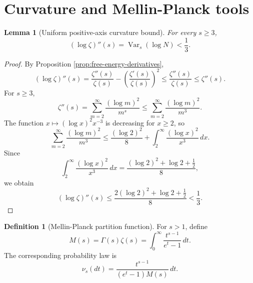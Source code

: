 \documentclass[11pt]{article}
\numberwithin{equation}{section}
\newtheorem{lemma}[theorem]{Lemma}
\theoremstyle{definition}
\newtheorem{definition}[theorem]{Definition}
\theoremstyle{remark}
\DeclareMathOperator{\Var}{Var}
\newcommand{\1}{\mathbf 1}
\begin{document}
\section{Curvature and Mellin-Planck tools}

\begin{lemma}[Uniform positive-axis curvature bound]
\label{lem:uniform-positive-axis-curvature}
For every \(s\ge3\),
\begin{equation}
\label{eq:uniform-curvature-bound}
(\log\zeta)''(s)=\Var_s(\log N)<\frac13.
\end{equation}
\end{lemma}

\begin{proof}
By Proposition \ref{prop:free-energy-derivatives},
\begin{equation}
\label{eq:curvature-first-bound}
(\log\zeta)''(s)
=\frac{\zeta''(s)}{\zeta(s)}
-\left(\frac{\zeta'(s)}{\zeta(s)}\right)^2
\le \frac{\zeta''(s)}{\zeta(s)}
\le \zeta''(s).
\end{equation}
For \(s\ge3\),
\begin{equation}
\label{eq:zeta-second-derivative-bound}
\zeta''(s)=\sum_{m=2}^{\infty}\frac{(\log m)^2}{m^s}
\le\sum_{m=2}^{\infty}\frac{(\log m)^2}{m^3}.
\end{equation}
The function \(x\mapsto(\log x)^2x^{-3}\) is decreasing for \(x\ge2\), so
\begin{equation}
\label{eq:curvature-integral-comparison}
\sum_{m=2}^{\infty}\frac{(\log m)^2}{m^3}
\le
\frac{(\log2)^2}{8}
+\int_2^\infty\frac{(\log x)^2}{x^3}\,dx.
\end{equation}
Since
\begin{equation}
\label{eq:curvature-integral-value}
\int_2^\infty\frac{(\log x)^2}{x^3}\,dx
=\frac{(\log2)^2+\log2+\frac12}{8},
\end{equation}
we obtain
\begin{equation}
\label{eq:curvature-final-bound}
(\log\zeta)''(s)
\le
\frac{2(\log2)^2+\log2+\frac12}{8}
<\frac13.
\end{equation}
\end{proof}

\begin{definition}[Mellin-Planck partition function]
\label{def:mellin-planck-partition}
For \(s>1\), define
\begin{equation}
\label{eq:mellin-planck-partition}
M(s)=\Gamma(s)\zeta(s)
=\int_0^\infty\frac{t^{s-1}}{e^t-1}\,dt.
\end{equation}
The corresponding probability law is
\begin{equation}
\label{eq:mellin-planck-law}
\nu_s(dt)=\frac{t^{s-1}}{(e^t-1)M(s)}\,dt.
\end{equation}
\end{definition}
\end{document}
